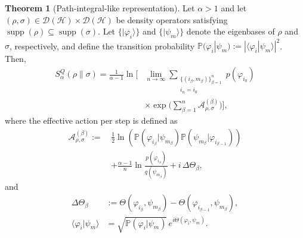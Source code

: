 \documentclass[a4paper, amsfonts, amssymb, amsmath, reprint, showkeys, nofootinbib, twoside, aps, pra]{revtex4-2}
\theoremstyle{definition}
\newtheorem{theorem}{Theorem}
\begin{document}
\begin{theorem}[Path-integral-like representation]
\label{prop:path_integral}
Let $\alpha>1$ and let $(\rho,\sigma)\in
\mathcal D(\mathcal H)\times
\mathcal D(\mathcal H)$
be density operators satisfying 
$\operatorname{supp}(\rho)\subseteq\operatorname{supp}(\sigma)$. 
Let $\{|\varphi_i\rangle\}$ and $\{|\psi_m\rangle\}$ denote the eigenbases of $\rho$ and $\sigma$, respectively, and define the transition probability 
$\mathbb{P}(\varphi_i|\psi_m):=|\langle\varphi_i|\psi_m\rangle|^2$. Then,
\begin{equation}
\label{eq:path_integral_form_new}
\begin{split}
S_\alpha^{Q}(\rho\|\sigma) 
= \frac{1}{\alpha-1}\ln\Biggl[ 
&\lim_{n\to\infty}
\sum_{\substack{\{(i_\beta,m_\beta)\}_{\beta=1}^n \\ i_n = i_0}} 
p(\varphi_{i_0}) \\
&\times \exp\Biggl(\sum_{\beta=1}^n 
\mathcal{A}_{\rho,\sigma}^{(\beta)}\Biggr)\Biggr],
\end{split}
\end{equation}
where the effective action per step is defined as
\begin{equation}
\begin{split}
\mathcal{A}_{\rho,\sigma}^{(\beta)} 
:= \,&\frac{1}{2}\ln\!\left( 
\mathbb{P}(\varphi_{i_\beta}|\psi_{m_\beta})
\mathbb{P}(\psi_{m_\beta}|\varphi_{i_{\beta-1}})
\right) \\
&+ \frac{\alpha-1}{n} \ln\frac{p(\varphi_{i_\beta})}{q(\psi_{m_\beta})} 
+ i\,\Delta\Theta_\beta,
\end{split}
\end{equation}
and
\begin{equation}
\begin{split}
\Delta\Theta_\beta 
&:= \Theta(\varphi_{i_\beta},\psi_{m_\beta}) 
   - \Theta(\varphi_{i_{\beta-1}},\psi_{m_\beta}), \\
\langle\varphi_i|\psi_m\rangle 
&= \sqrt{\mathbb{P}(\varphi_i|\psi_m)}\,e^{i\Theta(\varphi_i,\psi_m)}.
\end{split}
\end{equation}
\end{theorem}
\end{document}
